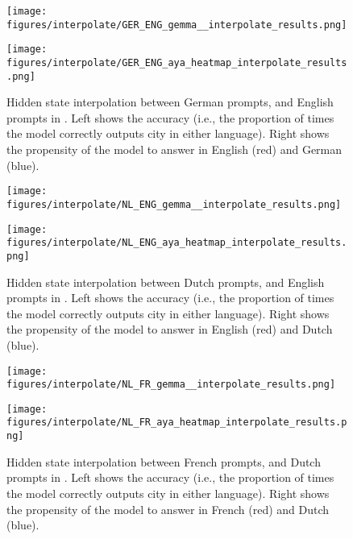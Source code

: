 \begin{figure}[h]
\begin{minipage}{0.49\textwidth}
    \centering
    \texttt{[image: figures/interpolate/GER\_ENG\_gemma\_\_interpolate\_results.png]} 
\end{minipage}
\begin{minipage}{0.49\textwidth}
    \centering
    \texttt{[image: figures/interpolate/GER\_ENG\_aya\_heatmap\_interpolate\_results.png]} 
\end{minipage}
\caption{Hidden state interpolation between German prompts, and English prompts in \gemma. Left shows the accuracy (i.e., the proportion of times the model correctly outputs city in either language). Right shows the propensity of the model to answer in English (red) and German (blue). }
\end{figure}


\begin{figure}[h]
\begin{minipage}{0.49\textwidth}
    \centering
    \texttt{[image: figures/interpolate/NL\_ENG\_gemma\_\_interpolate\_results.png]} 
\end{minipage}
\begin{minipage}{0.49\textwidth}
    \centering
    \texttt{[image: figures/interpolate/NL\_ENG\_aya\_heatmap\_interpolate\_results.png]} 
\end{minipage}
\caption{Hidden state interpolation between Dutch prompts, and English prompts in \gemma. Left shows the accuracy (i.e., the proportion of times the model correctly outputs city in either language). Right shows the propensity of the model to answer in English (red) and Dutch (blue). }
\end{figure}


\begin{figure}[h]
\begin{minipage}{0.49\textwidth}
    \centering
    \texttt{[image: figures/interpolate/NL\_FR\_gemma\_\_interpolate\_results.png]} 
\end{minipage}
\begin{minipage}{0.49\textwidth}
    \centering
    \texttt{[image: figures/interpolate/NL\_FR\_aya\_heatmap\_interpolate\_results.png]} 
\end{minipage}
\caption{Hidden state interpolation between French prompts, and Dutch prompts in \gemma. Left shows the accuracy (i.e., the proportion of times the model correctly outputs city in either language). Right shows the propensity of the model to answer in French (red) and Dutch (blue). }
\end{figure}


